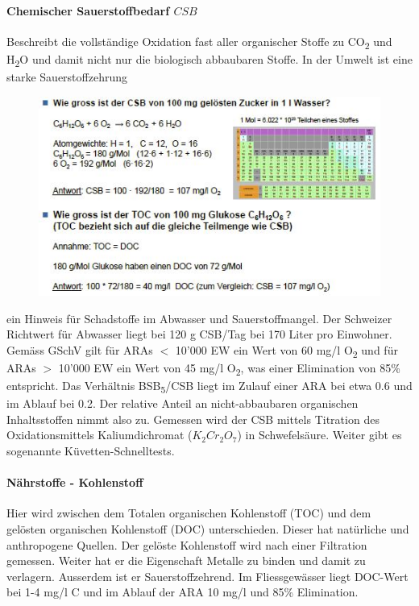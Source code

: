 \documentclass[9pt, openright=false]{scrartcl}
\begin{document}
\paragraph{Chemischer Sauerstoffbedarf $CSB$} Beschreibt die vollständige Oxidation fast aller organischer Stoffe zu CO\textsubscript{2} und H\textsubscript{2}O und damit nicht nur die biologisch abbaubaren Stoffe. In der Umwelt ist eine starke Sauerstoffzehrung\begin{figure} 
  \includegraphics[width=.5\textwidth]{images/AufgabeCSBTOC}
\end{figure} ein Hinweis für Schadstoffe im Abwasser und Sauerstoffmangel. Der Schweizer Richtwert für Abwasser liegt bei 120 g CSB/Tag bei 170 Liter pro Einwohner. Gemäss GSchV gilt für ARAs $<$ 10'000 EW ein Wert von 60 mg/l O\textsubscript{2} und für ARAs $>$ 10'000 EW ein Wert von 45 mg/l O\textsubscript{2}, was einer Elimination von 85\% entspricht. Das Verhältnis BSB\textsubscript{5}/CSB liegt im Zulauf einer ARA bei etwa 0.6 und im Ablauf bei 0.2. Der relative Anteil an nicht-abbaubaren organischen Inhaltsstoffen nimmt also zu. Gemessen wird der CSB mittels Titration des Oxidationsmittels Kaliumdichromat ($K_2Cr_2O_7$) in Schwefelsäure. Weiter gibt es sogenannte Küvetten-Schnelltests.
\paragraph{Nährstoffe - Kohlenstoff} Hier wird zwischen dem Totalen organischen Kohlenstoff (TOC) und dem gelösten organischen Kohlenstoff (DOC) unterschieden. Dieser hat natürliche und anthropogene Quellen. Der gelöste Kohlenstoff wird nach einer Filtration gemessen. Weiter hat er die Eigenschaft Metalle zu binden und damit zu verlagern. Ausserdem ist er Sauerstoffzehrend. Im Fliessgewässer liegt DOC-Wert bei 1-4 mg/l C und im Ablauf der ARA 10 mg/l und 85\% Elimination.
\end{document}
